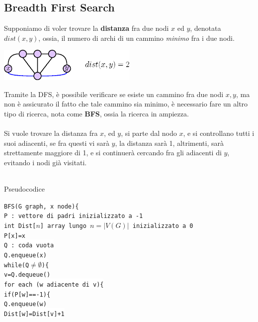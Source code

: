 \documentclass[12pt, letterpaper]{article}
\newcommand{\codee}[1]{\colorbox{white}{\texttt{#1}}}
\newcommand{\acc}{\\\hphantom{}\\}
\begin{document}
\subsection{Breadth First Search}
Supponiamo di voler trovare la \textbf{distanza} fra due nodi $x$ ed $y$, denotata $dist(x,y)$, ossia, il numero di archi di un
cammino \textit{minimo} fra i due nodi.\begin{center}
    \includegraphics[width=0.5\textwidth ]{images/dist.eps}
\end{center}
Tramite la DFS, è possibile verificare se esiste un cammino fra  due nodi $x,y$, ma non è assicurato il fatto che tale
cammino sia minimo, è necessario fare un altro tipo di ricerca, nota come  \textbf{BFS}, ossia la ricerca in ampiezza.\acc
Si vuole trovare la distanza fra $x$, ed $y$, si parte dal nodo $x$, e si controllano tutti i suoi adiacenti, se fra questi
vi sarà $y$, la distanza sarà 1, altrimenti, sarà strettamente maggiore di 1, e si continuerà cercando fra gli adiacenti
di $y$, evitando i nodi già visitati. \acc
\begin{center}
    Pseudocodice
\end{center}
\codee{BFS(G graph, x node)\{}\\
\hphantom{ident}\codee{P : vettore di padri inizializzato a -1}\\
\hphantom{ident}\codee{int Dist[$n$] array lungo $n=|V(G)|$ inizializzato a 0}\\
\hphantom{ident}\codee{P[x]=x}\\
\hphantom{ident}\codee{Q : coda vuota}\\
\hphantom{ident}\codee{Q.enqueue(x)}\\
\hphantom{ident}\codee{while(Q$\ne\emptyset$)\{}\\
\hphantom{ident}\hphantom{ident}\codee{v=Q.dequeue()}\\
\hphantom{ident}\hphantom{ident}\codee{for each (w adiacente di v)\{}\\
\hphantom{ident}\hphantom{ident}\hphantom{ident}\codee{if(P[w]==-1)\{}\\
\hphantom{ident}\hphantom{ident}\hphantom{ident}\hphantom{ident}\codee{Q.enqueue(w)}\\
\hphantom{ident}\hphantom{ident}\hphantom{ident}\hphantom{ident}\codee{Dist[w]=Dist[v]+1}\\
\end{document}
